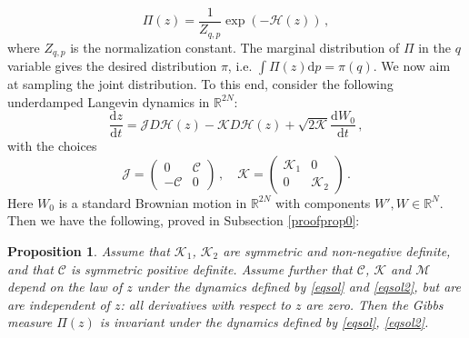 \documentclass[12pt]{caltech_thesis}
\newtheorem{proposition}[theorem]{Proposition}
\numberwithin{equation}{section}
\begin{document}
\begin{equation}
\label{eq:Hneed}
\Pi(z)=\frac{1}{Z_{q,p}}\exp(-\mathcal{H}(z))\,,
\end{equation}
where  $Z_{q,p}$ is the normalization constant. The marginal distribution of $\Pi$ in the $q$ variable gives the desired distribution $\pi$, i.e. $\int \Pi(z) \mathrm{d}p=\pi(q)$.
    We now aim at sampling the joint distribution. To this end, consider the following underdamped Langevin dynamics in $\mathbb{R}^{2N}$:
\begin{equation}
\label{eqsol}
\frac{\mathrm{d} z}{\mathrm{d} t}=\mathcal{J} D {\mathcal{H}}(z)-\mathcal{K} D {\mathcal{H}}(z)+\sqrt{2 \mathcal{K}} \frac{\mathrm{d} W_0}{\mathrm{d} t}\,,
\end{equation}
with the choices 
\begin{equation}
\label{eqsol2}
\mathcal{J}=\begin{pmatrix}
0 & \mathcal{C} \\
-\mathcal{C} & 0
\end{pmatrix}\,,\quad
\mathcal{K}=\begin{pmatrix}
\mathcal{K}_{1} & 0 \\
0 & \mathcal{K}_{2}
\end{pmatrix}\,.
\end{equation}
Here $W_0$ is a  standard Brownian motion in $\mathbb{R}^{2N}$ with components $W', W \in \mathbb{R}^{N}$. Then we have the following, proved in Subsection
\ref{proofprop0}:

\vspace{0.1in}

\begin{proposition}
\label{prop.prop0}
{Assume that $\mathcal{K}_1$, $\mathcal{K}_2$ are symmetric and 
non-negative definite, and that $\mathcal{C}$ is symmetric positive definite. 
Assume further that $\mathcal{C}$, $\mathcal{K}$ and $\mathcal{M}$ depend
on the law of $z$ under the dynamics defined by \eqref{eqsol} and \eqref{eqsol2},
but are are independent of $z$: all derivatives with respect to $z$
are zero. Then the Gibbs measure $\Pi(z)$ is invariant under the dynamics defined
by \eqref{eqsol}, \eqref{eqsol2}.}
\end{proposition}

\vspace{0.1in}
\end{document}
